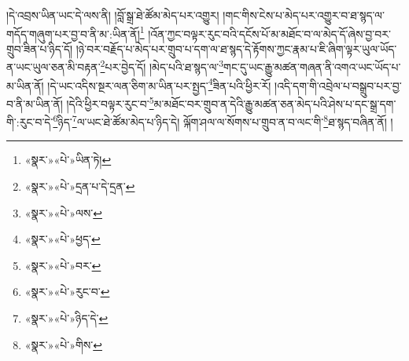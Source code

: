།དེ་འབྲས་ཡིན་ཡང་དེ་ལས་ནི། །བློ་སྒྲ་ཐེ་ཚོམ་མེད་པར་འགྱུར། །གང་གིས་ངེས་པ་མེད་པར་འགྱུར་བ་ཐ་སྙད་ལ་གདོད་གཞུག་པར་བྱ་བ་ནི་མ་:ཡིན་ནོ།\footnote{«སྣར་»«པེ་»ཡིན་ཏེ།} །འོན་ཀྱང་བལྟར་རུང་བའི་དངོས་པོ་མ་མཐོང་བ་ལ་མེད་དོ་ཞེས་བྱ་བར་གྲུབ་ཟིན་པ་ཉིད་དོ། །ཉེ་བར་བརྗོད་པ་མེད་པར་གྲུབ་པ་དག་ལ་ཐ་སྙད་དེ་རྟོགས་ཀྱང་རྣམ་པ་ཇི་ཞིག་ལྟར་ཡུལ་ཡོད་ན་ཡང་ཡུལ་ཅན་མི་བརྟན་\footnote{«སྣར་»«པེ་»དྲན་པ་དེ་དྲན་}པར་བྱེད་དོ། །མེད་པའི་ཐ་སྙད་ལ་\footnote{«སྣར་»«པེ་»ལས་}གང་དུ་ཡང་རྒྱུ་མཚན་གཞན་ནི་འགའ་ཡང་ཡོད་པ་མ་ཡིན་ནོ། །དེ་ཡང་འདིས་སྔར་ལན་ཅིག་མ་ཡིན་པར་སྤྱད་\footnote{«སྣར་»«པེ་»ཕྱད་}ཟིན་པའི་ཕྱིར་རོ། །འདི་དག་གི་འབྲེལ་པ་བསྒྲུབ་པར་བྱ་བ་ནི་མ་ཡིན་ནོ། །དེའི་ཕྱིར་བལྟར་རུང་བ་\footnote{«སྣར་»«པེ་»བར་}མ་མཐོང་བར་གྲུབ་ན་དེའི་རྒྱུ་མཚན་ཅན་མེད་པའི་ཤེས་པ་དང་སྒྲ་དག་གི་:རུང་བ་དེ་\footnote{«སྣར་»«པེ་»རུང་བ་}ཉིད་\footnote{«སྣར་»«པེ་»ཉིད་དེ་}ལ་ཡང་ཐེ་ཚོམ་མེད་པ་ཉིད་དེ། ལྐོག་ཤལ་ལ་སོགས་པ་གྲུབ་ན་བ་ལང་གི་\footnote{«སྣར་»«པེ་»གིས་}ཐ་སྙད་བཞིན་ནོ། །

